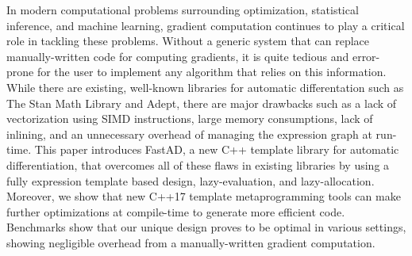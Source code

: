In modern computational problems surrounding optimization, statistical inference, and machine learning,
gradient computation continues to play a critical role in tackling these problems.
Without a generic system that can replace manually-written code for computing gradients,
it is quite tedious and error-prone for the user to implement any algorithm that relies on this information.
While there are existing, well-known libraries for automatic differentation such as The Stan Math Library
and Adept, there are major drawbacks such as 
a lack of vectorization using SIMD instructions, 
large memory consumptions,
lack of inlining, 
and an unnecessary overhead of managing the expression graph at run-time.
This paper introduces FastAD, a new C++ template library for automatic differentiation,
that overcomes all of these flaws in existing libraries by using
a fully expression template based design,
lazy-evaluation,
and lazy-allocation.
Moreover, we show that new C++17 template metaprogramming tools can 
make further optimizations at compile-time to generate more efficient code.
Benchmarks show that our unique design proves to be optimal in various settings,
showing negligible overhead from a manually-written gradient computation.
